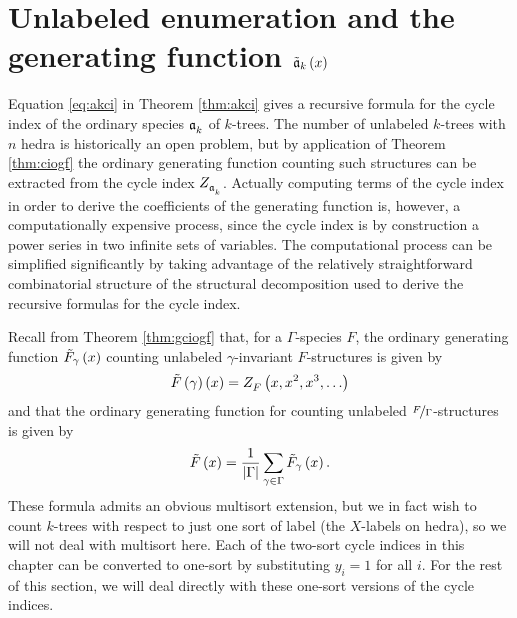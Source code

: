 \documentclass[distribution,draft]{brandiss} %
\numberwithin{section}{chapter}
\numberwithin{figure}{chapter}
\begin{document}
\section{Unlabeled enumeration and the generating function $\tilde{\mathfrak{a}}_{k} \left( {x} \right)$}
Equation \eqref{eq:akci} in Theorem \ref{thm:akci} gives a recursive formula for the cycle index of the ordinary species $\mathfrak{a}_{k}^{}$ of $k$-trees.
The number of unlabeled $k$-trees with $n$ hedra is historically an open problem, but by application of Theorem \ref{thm:ciogf} the ordinary generating function counting such structures can be extracted from the cycle index $ Z_{\mathfrak{a}_{k}^{}}^{} $.
Actually computing terms of the cycle index in order to derive the coefficients of the generating function is, however, a computationally expensive process, since the cycle index is by construction a power series in two infinite sets of variables.
The computational process can be simplified significantly by taking advantage of the relatively straightforward combinatorial structure of the structural decomposition used to derive the recursive formulas for the cycle index.

Recall from Theorem \ref{thm:gciogf} that, for a $\Gamma$-species $F$, the ordinary generating function $\tilde{F}_{\gamma} \left( {x} \right)$ counting unlabeled $\gamma$-invariant $F$-structures is given by
\[\tilde{F} \left( {\gamma} \right) \left( {x} \right) =  Z_{F}^{} \left( {x, x^2, x^3, \dots} \right) \]
and that the ordinary generating function for counting unlabeled $\nicefrac{F}{\Gamma}$-structures is given by
\[\tilde{F} \left( {x} \right) = \frac{1}{\left\vert {\Gamma} \right\vert} \sum_{\gamma \in \Gamma} \tilde{F}_{\gamma} \left( {x} \right).\]
These formula admits an obvious multisort extension, but we in fact wish to count $k$-trees with respect to just one sort of label (the $X$-labels on hedra), so we will not deal with multisort here.
Each of the two-sort cycle indices in this chapter can be converted to one-sort by substituting $y_{i} = 1$ for all $i$.
For the rest of this section, we will deal directly with these one-sort versions of the cycle indices.
\end{document}
